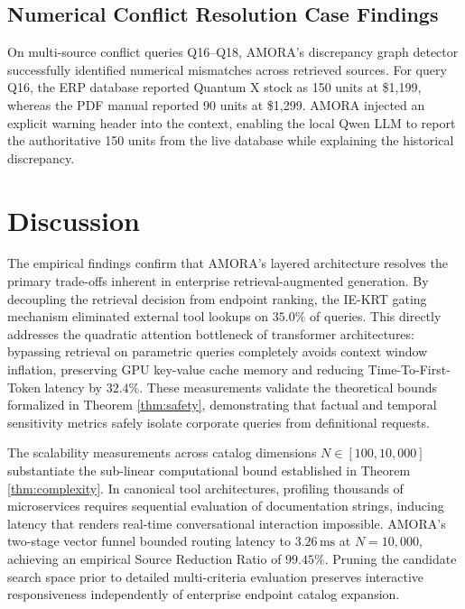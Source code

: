 \documentclass[conference,onecolumn,10pt]{IEEEtran}
\begin{document}
\subsection{Numerical Conflict Resolution Case Findings}
On multi-source conflict queries Q16--Q18, AMORA's discrepancy graph detector successfully identified numerical mismatches across retrieved sources. For query Q16, the ERP database reported Quantum X stock as 150 units at \$1,199, whereas the PDF manual reported 90 units at \$1,299. AMORA injected an explicit warning header into the context, enabling the local Qwen LLM to report the authoritative 150 units from the live database while explaining the historical discrepancy.

\section{Discussion}
\label{sec:discussion}

The empirical findings confirm that AMORA's layered architecture resolves the primary trade-offs inherent in enterprise retrieval-augmented generation. By decoupling the retrieval decision from endpoint ranking, the IE-KRT gating mechanism eliminated external tool lookups on $35.0\%$ of queries. This directly addresses the quadratic attention bottleneck of transformer architectures: bypassing retrieval on parametric queries completely avoids context window inflation, preserving GPU key-value cache memory and reducing Time-To-First-Token latency by $32.4\%$. These measurements validate the theoretical bounds formalized in Theorem \ref{thm:safety}, demonstrating that factual and temporal sensitivity metrics safely isolate corporate queries from definitional requests.

The scalability measurements across catalog dimensions $N \in [100, 10{,}000]$ substantiate the sub-linear computational bound established in Theorem \ref{thm:complexity}. In canonical tool architectures, profiling thousands of microservices requires sequential evaluation of documentation strings, inducing latency that renders real-time conversational interaction impossible. AMORA's two-stage vector funnel bounded routing latency to $3.26\,\text{ms}$ at $N=10{,}000$, achieving an empirical Source Reduction Ratio of $99.45\%$. Pruning the candidate search space prior to detailed multi-criteria evaluation preserves interactive responsiveness independently of enterprise endpoint catalog expansion.
\end{document}

